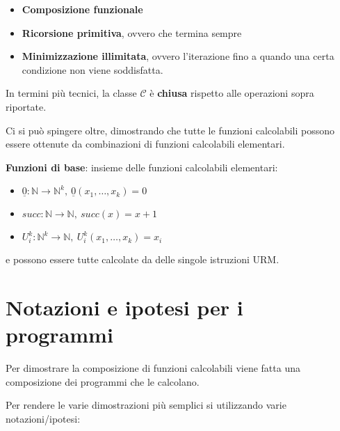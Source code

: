 \begin{itemize}
\item
  \textbf{Composizione funzionale}
\item
  \textbf{Ricorsione primitiva}, ovvero che termina sempre
\item
  \textbf{Minimizzazione illimitata}, ovvero l'iterazione fino a
  quando una certa condizione non viene soddisfatta.
\end{itemize}

In termini più tecnici, la classe $\mathcal{C}$ è \textbf{chiusa}
rispetto alle operazioni sopra riportate.

Ci si può spingere oltre, dimostrando che tutte le funzioni calcolabili
possono essere ottenute da combinazioni di funzioni calcolabili
elementari.

\textbf{Funzioni di base}: insieme delle funzioni calcolabili
elementari:

\begin{itemize}
\item
  $\underline{0} : \mathbb{N} \rightarrow \mathbb{N}^k,\: \underline{0}(x_1,\ldots{},x_k) = 0$
\item
  $succ: \mathbb{N} \rightarrow \mathbb{N},\: succ(x) = x+1$
\item
  $U_i^k : \mathbb{N}^k \rightarrow \mathbb{N},\: U_i^k(x_1,\ldots,x_k) = x_i$
\end{itemize}

e possono essere tutte calcolate da delle singole istruzioni URM.

\section{Notazioni e ipotesi per i programmi}\label{notazioni-e-ipotesi-per-i-programmi}

Per dimostrare la composizione di funzioni calcolabili viene fatta una
composizione dei programmi che le calcolano.

Per rendere le varie dimostrazioni più semplici si utilizzando varie
notazioni/ipotesi:

